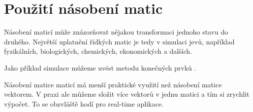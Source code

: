 
\section{Použití násobení matic}

Násobení maticí může znázorňovat nějakou transformaci jednoho stavu do druhého. Největší uplatnění řídkých matic je tedy v simulaci jevů, například fyzikálních, biologických, chemických, ekonomických a dalších. 

Jako příklad simulace můžeme uvést metodu konečných prvků \cite{4020926}\cite{0967-3334-30-6-S01}.


Násobení matice maticí má menší praktické využití než násobení matice vektorem. V praxi ale můžeme složit více vektorů v jednu matici a tím si zrychlit výpočet. To se obzvlášťě hodí pro real-time aplikace.




